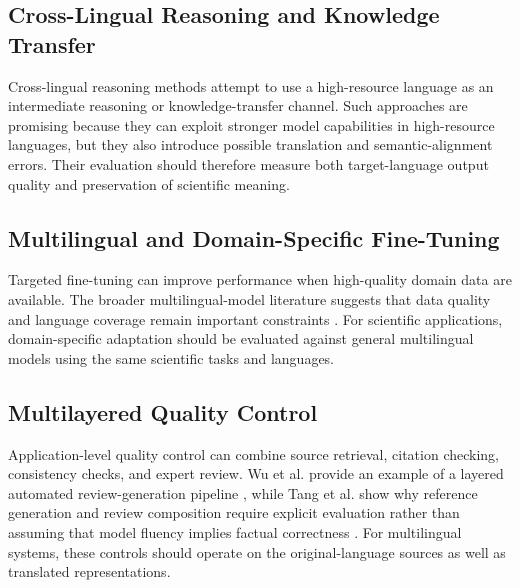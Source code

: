 \documentclass[acmsmall,screen,review]{acmart}
\begin{document}

\subsection{Cross-Lingual Reasoning and Knowledge Transfer}
\label{sec:crosslingual-reasoning}

Cross-lingual reasoning methods attempt to use a high-resource language as an intermediate reasoning or knowledge-transfer channel. Such approaches are promising because they can exploit stronger model capabilities in high-resource languages, but they also introduce possible translation and semantic-alignment errors. Their evaluation should therefore measure both target-language output quality and preservation of scientific meaning.


\subsection{Multilingual and Domain-Specific Fine-Tuning}
\label{sec:finetuning}

Targeted fine-tuning can improve performance when high-quality domain data are available. The broader multilingual-model literature suggests that data quality and language coverage remain important constraints \citep{xue2021mt5,bigscience2022bloom}. For scientific applications, domain-specific adaptation should be evaluated against general multilingual models using the same scientific tasks and languages.


\subsection{Multilayered Quality Control}
\label{sec:quality-control}

Application-level quality control can combine source retrieval, citation checking, consistency checks, and expert review. Wu et al. provide an example of a layered automated review-generation pipeline \citep{wu2025automated}, while Tang et al. show why reference generation and review composition require explicit evaluation rather than assuming that model fluency implies factual correctness \citep{tang2025automated}. For multilingual systems, these controls should operate on the original-language sources as well as translated representations.
\end{document}
